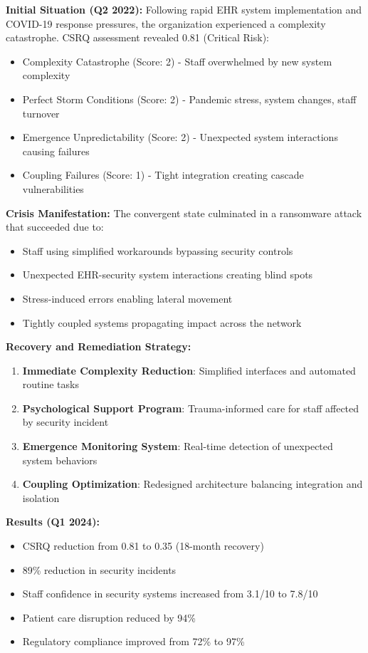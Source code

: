 \documentclass[11pt,a4paper]{article}
\begin{document}
\textbf{Initial Situation (Q2 2022):}
Following rapid EHR system implementation and COVID-19 response pressures, the organization experienced a complexity catastrophe. CSRQ assessment revealed 0.81 (Critical Risk):
\begin{itemize}
\item Complexity Catastrophe (Score: 2) - Staff overwhelmed by new system complexity
\item Perfect Storm Conditions (Score: 2) - Pandemic stress, system changes, staff turnover
\item Emergence Unpredictability (Score: 2) - Unexpected system interactions causing failures
\item Coupling Failures (Score: 1) - Tight integration creating cascade vulnerabilities
\end{itemize}

\textbf{Crisis Manifestation:}
The convergent state culminated in a ransomware attack that succeeded due to:
\begin{itemize}
\item Staff using simplified workarounds bypassing security controls
\item Unexpected EHR-security system interactions creating blind spots
\item Stress-induced errors enabling lateral movement
\item Tightly coupled systems propagating impact across the network
\end{itemize}

\textbf{Recovery and Remediation Strategy:}
\begin{enumerate}
\item \textbf{Immediate Complexity Reduction}: Simplified interfaces and automated routine tasks
\item \textbf{Psychological Support Program}: Trauma-informed care for staff affected by security incident
\item \textbf{Emergence Monitoring System}: Real-time detection of unexpected system behaviors
\item \textbf{Coupling Optimization}: Redesigned architecture balancing integration and isolation
\end{enumerate}

\textbf{Results (Q1 2024):}
\begin{itemize}
\item CSRQ reduction from 0.81 to 0.35 (18-month recovery)
\item 89\% reduction in security incidents
\item Staff confidence in security systems increased from 3.1/10 to 7.8/10
\item Patient care disruption reduced by 94\%
\item Regulatory compliance improved from 72\% to 97\%
\end{itemize}
\end{document}
